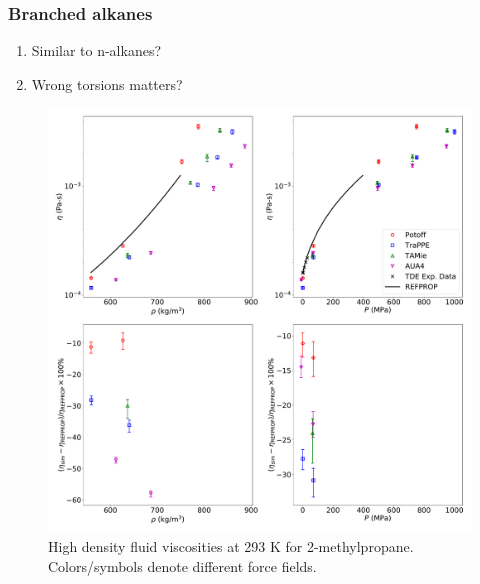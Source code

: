 \documentclass[preprint,review,12pt]{elsarticle}
\begin{document}
\subsubsection{Branched alkanes}

\begin{enumerate}
	\item Similar to n-alkanes? 
	\item Wrong torsions matters?
\end{enumerate}

%

\begin{figure}[p!]
	\centering
	\includegraphics[width=6.4in]{compare_REFPROP_T293highP_IC4H10.pdf}
	\caption{High density fluid viscosities at 293 K for 2-methylpropane. Colors/symbols denote different force fields.}
	\label{fig:T293highP_IC4}
\end{figure} 
\end{document}
